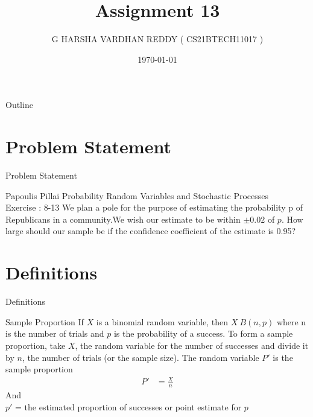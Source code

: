 \documentclass{beamer}
\title{Assignment 13}
\author[CS21BTECH11017]{G HARSHA VARDHAN REDDY ( CS21BTECH11017 )}
\date{\today}
\begin{document}
\begin{frame}
    \titlepage 
\end{frame}

\logo{}


\begin{frame}{Outline}
    \tableofcontents
\end{frame}

\section{Problem Statement}
\begin{frame}{Problem Statement}
    \begin{block} {Papoulis Pillai Probability Random Variables and Stochastic Processes\\ 
    Exercise : 8-13}
    We plan a pole for the purpose of estimating the probability p of Republicans in a community.We wish our estimate to be within $\pm 0.02$ of  $p$. How large should our sample be if the confidence coefficient of the estimate is 0.95?
    \end{block}
\end{frame}
\section{Definitions}
\begin{frame}{Definitions}
    \begin{block}{Sample Proportion}
     If $X$ is a binomial random variable, then $X ~ B(n, p)$ where n is the number of trials and $p$ is the probability of a success. To form a sample proportion, take $X$, the random variable for the number of successes and divide it by $n$, the number of trials (or the sample size). The random variable $P'$ is the sample proportion
     \begin{align}
         P' &= \frac{X}{n} 
     \end{align}
And \\
    $p'$ =  the estimated proportion of successes or point estimate for $p$
    \end{block}
\end{frame}
\end{document}
